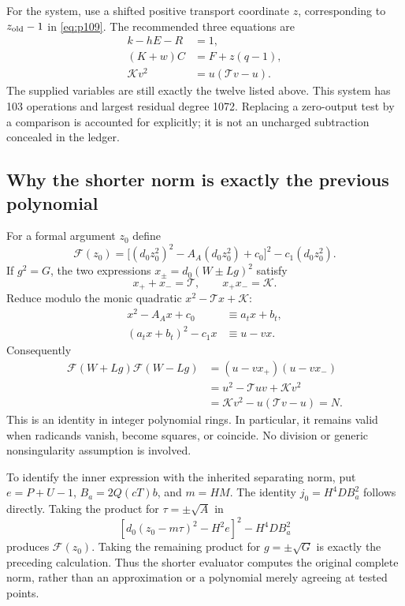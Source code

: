 \documentclass[11pt]{article}
\begin{document}
For the system, use a shifted positive transport coordinate $z$, corresponding
to $z_{\rm old}-1$ in \eqref{eq:p109}. The recommended three equations are
\begin{equation}\boxed{
 \begin{aligned}
 k-hE-R&=1,\\
 (K+w)C&=F+z(q-1),\\
 \mathcal K v^2&=u(\mathcal T v-u).
 \end{aligned}}\label{eq:s103}
\end{equation}
The supplied variables are still exactly the twelve listed above. This system
has 103 operations and largest residual degree 1072. Replacing a zero-output
test by a comparison is accounted for explicitly; it is not an uncharged
subtraction concealed in the ledger.

\subsection{Why the shorter norm is exactly the previous polynomial}

For a formal argument $z_0$ define
\[
 \mathcal F(z_0)=
 \bigl[(d_0z_0^2)^2-A_A(d_0z_0^2)+c_0\bigr]^2-c_1(d_0z_0^2).
\]
If $g^2=G$, the two expressions $x_\pm=d_0(W\pm Lg)^2$ satisfy
\[
 x_++x_-=\mathcal T,\qquad x_+x_-=\mathcal K.
\]
Reduce modulo the monic quadratic $x^2-\mathcal T x+\mathcal K$:
\begin{align*}
 x^2-A_Ax+c_0&\equiv a_tx+b_t,\\
 (a_tx+b_t)^2-c_1x&\equiv u-vx.
\end{align*}
Consequently
\begin{align*}
 \mathcal F(W+Lg)\mathcal F(W-Lg)
 &=(u-vx_+)(u-vx_-)\\
 &=u^2-\mathcal Tuv+\mathcal Kv^2\\
 &=\mathcal Kv^2-u(\mathcal Tv-u)=N.
\end{align*}
This is an identity in integer polynomial rings. In particular, it remains
valid when radicands vanish, become squares, or coincide. No division or
generic nonsingularity assumption is involved.

To identify the inner expression with the inherited separating norm, put
$e=P+U-1$, $B_a=2Q(cT)b$, and $m=HM$. The identity
$j_0=H^4DB_a^2$ follows directly. Taking the product for
$\tau=\pm\sqrt A$ in
\[
 [d_0(z_0-m\tau)^2-H^2e]^2-H^4DB_a^2
\]
produces $\mathcal F(z_0)$. Taking the remaining product for
$g=\pm\sqrt G$ is exactly the preceding calculation. Thus the shorter
evaluator computes the original complete norm, rather than an approximation
or a polynomial merely agreeing at tested points.
\end{document}
